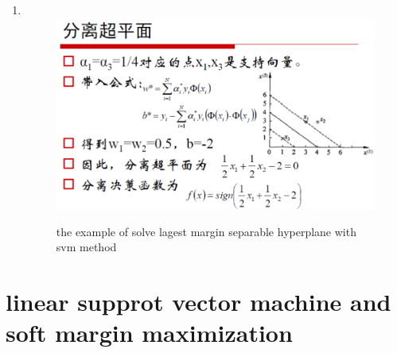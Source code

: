 \documentclass[oneside, 12pt]{ctexbook}
\begin{document}
\begin{enumerate}
\begin{enumerate}[]
							\item 
								\begin{figure}[H]
									\label{fig:13}
									\vspace{-0.2cm}  %
									\setlength{\abovecaptionskip}{-0.2cm}   %
									\centering
									\includegraphics[scale=0.7]{separable_dataset_svm_example3.png}
									\renewcommand{\figurename}{Fig} %
									\caption{the example of solve lagest margin separable hyperplane with svm method}
								\end{figure}							
						\end{enumerate}
				\end{enumerate}
			
		\section{\quad linear supprot vector machine and soft margin maximization}
\end{document}
